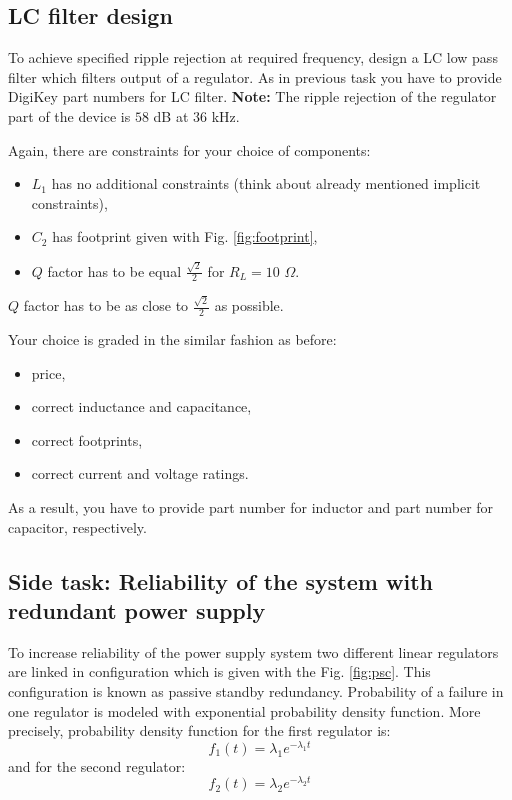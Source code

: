 \documentclass[openany]{book}
\begin{document}
	\newpage
	
	\subsection{LC filter design}
	\label{ele:task:2}
	To achieve specified ripple rejection at required frequency, design a LC 
	low 
	pass filter which filters output of a regulator. As in previous task you 
	have 
	to provide DigiKey part numbers for LC filter. \textbf{Note:} The ripple 
	rejection of the regulator part of the device is $58$ dB at $36$ kHz.
	
	Again, there are constraints for your choice of components:
	\begin{itemize}
		\item $L_1$ has no additional constraints 
		(think about already mentioned implicit constraints),
		\item $C_2$ has footprint given with Fig. \ref{fig:footprint},
		\item $Q$ factor has to be equal $\frac{\sqrt{2}}{2}$ for $R_L = 10$ 
		$\Omega$.  
	\end{itemize}
	$Q$ factor has to be as close to $\frac{\sqrt{2}}{2}$ as possible. 
	
	Your choice is graded in the similar fashion as before:
	\begin{itemize}
		\item price,
		\item correct inductance and capacitance,
		\item correct footprints, 
		\item correct current and voltage ratings.
	\end{itemize}
	As a result, you have to provide part number for inductor and 
	part number for capacitor, respectively. 
	\newpage
	\subsection{Side task: Reliability of the system with redundant power 
	supply} 
	\label{ele:task:3}
	To increase reliability of the power supply system two different linear 
	regulators are linked in configuration which is given with the Fig. 
	\ref{fig:psc}. This configuration is known as passive standby redundancy. 
	Probability of a failure in one regulator is modeled with exponential 
	probability density function. More precisely, probability density function 
	for 
	the first regulator is:  
	\begin{equation}
	f_1(t) = \lambda_1 e^{-\lambda_1 t}
	\end{equation}
	and for the second regulator:
	\begin{equation}
	f_2(t) = \lambda_2 e^{-\lambda_2 t}
	\end{equation}
	
\end{document}

